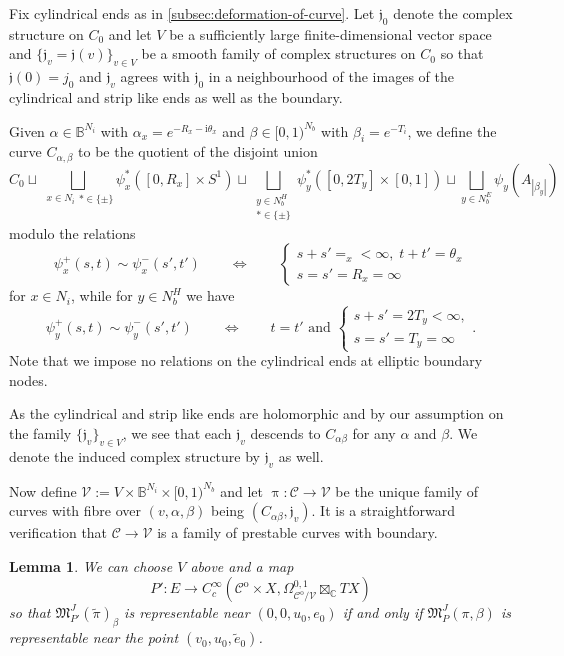 \documentclass[11pt,psamsfonts, oneside, reqno]{amsart}
\newcommand{\dimp}{\Leftrightarrow}
\newcommand{\cl}{\colon}
\newcommand{\djun}[1]{\bigsqcup\limits_{#1}}
\newcommand{\scC}{\mathscr{C}}
\newcommand{\scV}{\mathscr{V}}
\newcommand{\inn}{^\mathrm{o}}
\newcommand{\bB}{\mathbb{B}}
\newcommand{\bC}{\mathbb{C}}
\newcommand{\fM}{\mathfrak{M}}
\newcommand{\fj}{\mathfrak{j}}
\newcommand{\wt}{\widetilde}
\newcommand{\wh}{\widehat}
\newtheorem{lemma}[theorem]{Lemma}
\theoremstyle{definition}
\theoremstyle{remark}
\numberwithin{equation}{section}
\begin{document}
 Fix cylindrical ends as in \textsection\ref{subsec:deformation-of-curve}. 
 Let $\fj_0 $ denote the complex structure on $C_0$ and let $V$ be a sufficiently large finite-dimensional vector space and $\{\fj_v = \fj(v)\}_{v\in V}$ be a smooth family of complex structures on $C_0$ so that $\fj(0) = j_0$ and $\fj_v$ agrees with $\fj_0$ in a neighbourhood of the images of the cylindrical and strip like ends as well as the boundary.
 
 Given $\alpha \in \bB^{N_i}$ with $\alpha_x = e^{-R_x-\text{i}\theta_x}$ and $\beta \in [0,1)^{N_b}$ with $\beta_i = e^{-T_i}$, we define the curve $C_{\alpha,\beta}$ to be the quotient of the disjoint union 
 $$ \wh C_0 \sqcup \djun{\substack{x \in N_i}{*\in \{\pm\}}}{\psi_x^*([0,R_x]\times S^1)}\sqcup \djun{\substack{y \in N_b^H\\ *\in \{\pm\}}}{\psi_y^*([0, 2 T_y]\times [0,1])}\sqcup \djun{y \in N_b^E}{\psi_y(A_{|\beta_y|})}$$
modulo the relations 
$$\psi_x^+(s,t) \sim \psi_x^-(s',t') \qquad \dimp \qquad \begin{cases}
	s + s' =  _x < \infty, \; t + t' = \theta_x\\
	s = s' = R_x = \infty \end{cases}$$
for $x \in N_i$, while for $y \in N_b^H$ we have 
$$ \psi_y^+(s,t) \sim \psi_y^-(s',t') \qquad \dimp \qquad t = t' \text{ and } \begin{cases} s + s' =  2 T_y < \infty,\\
	s = s' = T_y = \infty\end{cases}.$$
Note that we impose no relations on the cylindrical ends at elliptic boundary nodes.\par
As the cylindrical and strip like ends are holomorphic and by our assumption on the family $\{\fj_v\}_{v\in V}$, we see that each $\fj_v$ descends to $C_{\alpha\beta}$ for any $\alpha$ and $\beta$. We denote the induced complex structure by $\fj_v$ as well.\par 
 Now define $\scV := V\times \bB^{N_i}\times [0,1)^{N_b}$ and let $\uppi\cl \scC\to \scV$ be the unique family of curves with fibre over $(v,\alpha,\beta)$ being $(C_{\alpha\beta},\fj_v)$. It is a straightforward verification that $\scC\to \scV$ is a family of prestable curves with boundary. 
 
 
 
 \begin{lemma}\label{lem:reduction-to-versal-deformation} We can choose $V$ above and a map 
 	\begin{equation*}P' \cl  E\to C^\infty_c(\scC\inn\times X,\Omega^{0,1}_{\scC\inn/\scV}\boxtimes_\bC TX) \end{equation*}
 	 so that $\fM^{J}_{P'}(\wt \pi)_\beta$ is representable near $(0,0,u_0,e_0)$ if and only if $\fM^{J}_P(\pi,\beta)$ is representable near the point $(v_0,u_0,\wt e_0)$. 
 \end{lemma}
\end{document}
